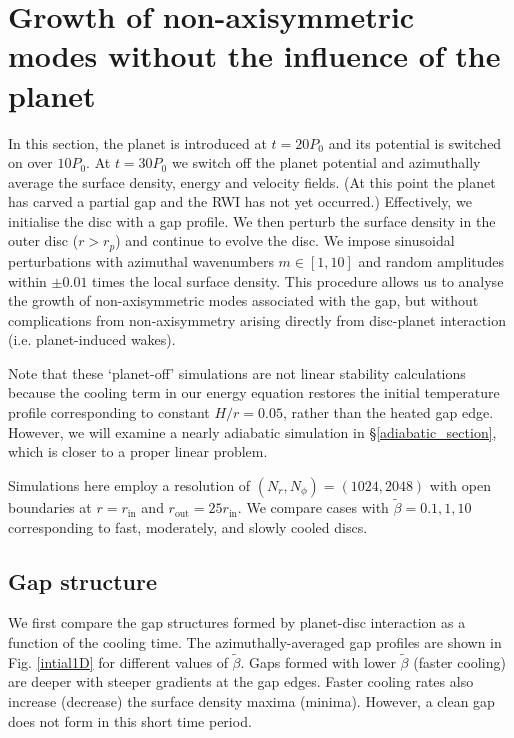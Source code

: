 \section{Growth of non-axisymmetric modes without the influence of the
  planet}\label{linear1} 
In this section, the planet is introduced at $t=20P_0$ and 
its potential is switched on over $10P_0$. At $t=30P_0$ we switch off the
planet potential and azimuthally average the surface density, energy
and velocity fields. (At this point the planet has carved a partial
gap and the RWI has not yet occurred.) Effectively, we initialise the
disc with a gap profile. 
We then perturb the surface density in the outer disc ($r>r_p$) and continue to 
evolve the disc. We impose  sinusoidal perturbations with 
azimuthal wavenumbers $m\in[1,10]$ and random amplitudes within $\pm 0.01$
times the local surface density. 
This procedure allows us to analyse the growth of 
non-axisymmetric modes associated with the gap, but without
complications from non-axisymmetry arising directly from disc-planet
interaction (i.e. planet-induced wakes). 

Note that these `planet-off' simulations are not linear stability
calculations because the cooling term in our energy equation
restores the initial temperature profile corresponding to constant
$H/r=0.05$, rather than the heated gap edge. However, we will 
examine a nearly adiabatic simulation in \S\ref{adiabatic_section},
which is closer to a proper linear problem. 

Simulations here employ a resolution of $(N_r,N_{\phi})=(1024,2048)$
with open boundaries at $r=r_\mathrm{in}$ and
$r_\mathrm{out}=25r_\mathrm{in}$. We compare cases with
$\tilde{\beta}=0.1,1,10$ corresponding to fast, moderately, 
and slowly cooled discs. 

\subsection{Gap structure}
We first compare the gap structures formed by planet-disc
interaction as a function of the cooling time. The azimuthally-averaged 
gap profiles are shown in Fig. \ref{intial1D} for different values of 
$\tilde\beta$. Gaps formed with lower $\tilde\beta$ (faster cooling) 
are deeper with steeper gradients at the gap edges. Faster cooling rates also 
increase (decrease) the surface density maxima (minima). However, a
clean gap does not form in this short time period.%

